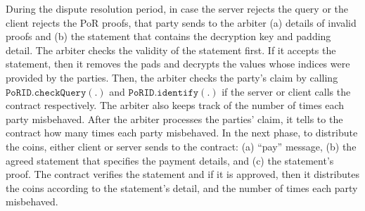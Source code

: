 During the dispute resolution period, in case the server rejects the query or the client rejects the PoR proofs, that party sends to the arbiter (a) details of invalid proofs and (b)  the statement that contains the decryption key and padding detail. The arbiter checks the validity of the statement first. If it accepts the statement, then it removes the pads and decrypts the values whose indices were provided by the parties. Then, the arbiter checks the party’s claim by calling $\mathtt{PoRID.checkQuery (.)}$ and $\mathtt{PoRID.identify (.)}$ if the server or client calls the contract respectively. The arbiter also keeps track of the number of times each party misbehaved.  After the arbiter processes the parties' claim, it tells to the contract how many times each party misbehaved.  In the next phase, to distribute the coins, either client or server sends to the contract: (a) “pay” message, (b) the agreed statement that specifies the payment details, and (c) the statement’s proof. The contract verifies the statement and if it is approved, then it distributes the coins according to the statement’s detail, and the number of times each party misbehaved. 



